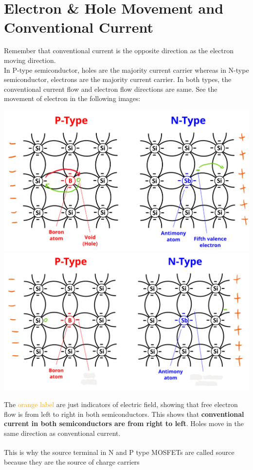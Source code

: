 \documentclass{article}
\begin{document}
	 \section{Electron \& Hole Movement and Conventional Current}
	 	Remember that conventional current is the opposite direction as the electron moving direction.\\
	 	In P-type semiconductor, holes are the majority current carrier whereas in N-type semiconductor, electrons are the majority current carrier. In both types, the conventional current flow and electron flow directions are same. See the movement of electron in the following images:
	 	\begin{center}
	 		\includegraphics[width=\textwidth]{img/current_flow_1.png}
	 		\includegraphics[width=\textwidth]{img/current_flow_2.png}
	 	\end{center}
	 	The \textcolor{orange}{orange label} are just indicators of electric field, showing that free electron flow is from left to right in both semiconductors. This shows that \textbf{conventional current in both semiconductors are from right to left}. Holes move in the same direction as conventional current.\\
	 	\\
	 	This is why the source terminal in N and P type MOSFETs are called source because they are the source of charge carriers
	 	\begin{circuitikz}
	 	\end{circuitikz}
	 	
	 	
		
		
\end{document}
